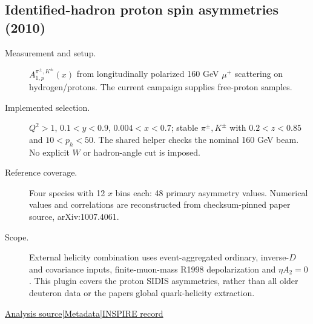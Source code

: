 \documentclass[11pt,a4paper]{article}
\newcommand{\id}[1]{{\small\texttt{\detokenize{#1}}}}
\begin{document}
\subsection{\texorpdfstring{Identified-hadron proton spin asymmetries (2010)}{Identified-hadron proton spin asymmetries (2010)}}
\id{COMPASS_2010_I862410}\quad\cite{r862410}
\begin{description}
\item[Measurement and setup.] $A_{1,p}^{\pi^\pm,K^\pm}(x)$ from longitudinally polarized 160 GeV $\mu^+$ scattering on hydrogen/protons. The current campaign supplies free-proton samples.
\item[Implemented selection.] $Q^2>1$, $0.1<y<0.9$, $0.004<x<0.7$; stable $\pi^\pm,K^\pm$ with $0.2<z<0.85$ and $10<p_h<50$. The shared helper checks the nominal 160 GeV beam. No explicit $W$ or hadron-angle cut is imposed.
\item[Reference coverage.] Four species with 12 $x$ bins each: 48 primary asymmetry values. Numerical values and correlations are reconstructed from checksum-pinned paper source, arXiv:1007.4061.
\item[Scope.] External helicity combination uses event-aggregated ordinary, inverse-$D$ and covariance inputs, finite-muon-mass R1998 depolarization and $\eta A_2=0$. This plugin covers the proton SIDIS asymmetries, rather than all older deuteron data or the paper\textquotesingle s global quark-helicity extraction.
\end{description}
{\small\href{https://github.com/apapaefs/HerwigPolarizedPheno/blob/105045bd757aaa6b217e87811dc5f9a22a8d1cef/analyses/rivet/dis/COMPASS_2010_I862410.cc}{Analysis source}\quad|\quad\href{https://github.com/apapaefs/HerwigPolarizedPheno/blob/105045bd757aaa6b217e87811dc5f9a22a8d1cef/analyses/rivet/dis/COMPASS_2010_I862410.info}{Metadata}\quad|\quad\href{https://inspirehep.net/literature/862410}{INSPIRE record}}
\end{document}
